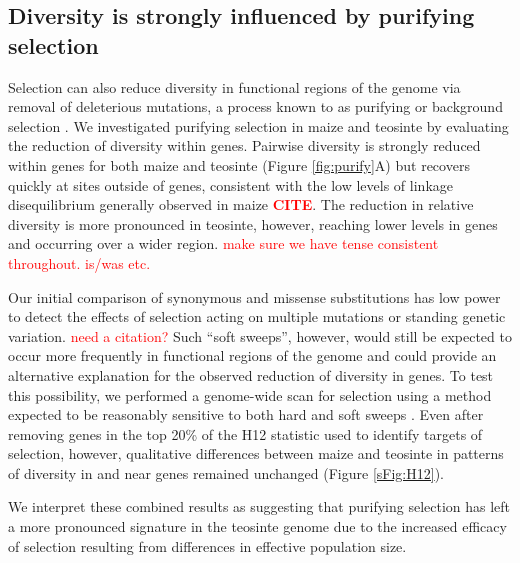 \documentclass{pnastwo}
\newcommand{\jri}[1]{\textcolor{red}{\scriptsize #1}}
\newcommand{\citex}{\textcolor{red}{\bf CITE}}
\begin{document}
\begin{article}
\subsection{Diversity is strongly influenced by purifying selection}

Selection can also reduce diversity in functional regions of the genome via removal of deleterious mutations, a process known to as purifying or background selection \cite{charlesworth1993}.
We investigated purifying selection in maize and teosinte by evaluating the reduction of diversity within genes.
Pairwise diversity is strongly reduced within genes for both maize and teosinte (Figure \ref{fig:purify}A) but recovers quickly at sites outside of genes, consistent with the low levels of linkage disequilibrium generally observed in maize \citex. 
The reduction in relative diversity is more pronounced in teosinte, however, reaching lower levels in genes and occurring over a wider region.  \jri{make sure we have tense consistent throughout. is/was etc.}

Our initial comparison of synonymous and missense substitutions has low power to detect the effects of selection acting on multiple mutations or standing genetic variation. \jri{need a citation?}
Such ``soft sweeps'', however, would still be expected to occur more frequently in functional regions of the genome and could provide an alternative explanation for the observed reduction of diversity in genes.
To test this possibility, we performed a genome-wide scan for selection using a method expected to be reasonably sensitive to both hard and soft sweeps \cite{garud2015}. 
Even after removing genes in the top 20\% of the H12 statistic used to identify targets of selection, however, qualitative differences between maize and teosinte in patterns of diversity in and near genes remained unchanged (Figure \ref{sFig:H12}).

We interpret these combined results as suggesting that purifying selection has left a more pronounced signature in the teosinte genome due to the increased efficacy of selection resulting from differences in effective population size. 


\end{article}
\end{document}
